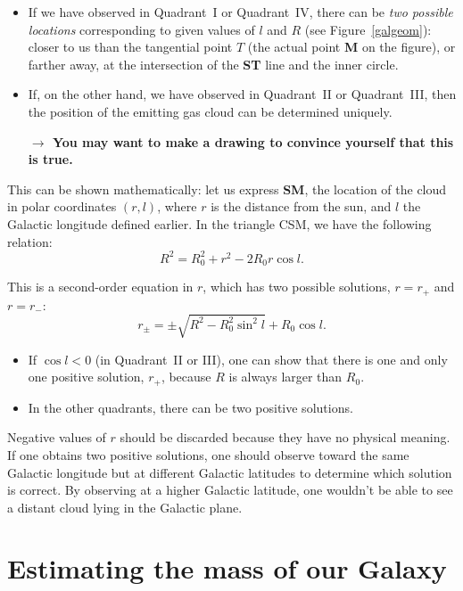 \begin{itemize}
\item{If we have observed in
Quadrant~I or Quadrant~IV, there can be {\em two possible locations} 
corresponding to given values of $l$ and $R$ (see
Figure~\ref{galgeom}): closer to us than the tangential point $T$
(the actual point {\bf M} on the figure), or farther away, at the
intersection of the {\bf ST} line and the inner circle.  }

\item{If, on the other
hand, we have observed in Quadrant~II or Quadrant~III, then the
position of the emitting gas cloud can be determined uniquely. 

{\bf{$\rightarrow$ You may want to make a drawing to convince yourself that
this is true.}} }
\end{itemize}

This can be shown mathematically: let us express {\bf SM}, 
the location of the cloud
in polar coordinates $(r,l)$, where $r$ is the distance from the sun,
and $l$ the Galactic longitude defined earlier.  In the triangle CSM,
we have the following relation:
\begin{equation}
R^2 = R_0^2 + r^2 - 2 R_0 r \cos l .
\end{equation}

This is a second-order equation in $r$, which has two possible solutions, 
$r=r_{+}$ and $r=r_{-}$:
\begin{equation}
\boxed{
r_\pm = \pm \sqrt{R^2 - R_0^2 \sin^2 l} + R_0\cos l .
}
\label{rpm}
\end{equation}

\begin{itemize}
\item{If $\cos l < 0$ (in Quadrant~II or III), one can show that
there is one and only one positive solution, $r_+$, because $R$ is
always larger than $R_0$.}

\item{In the other quadrants, there can be two
positive solutions.}
\end{itemize}

Negative values of $r$ should be discarded because  
they have no physical meaning.  If one obtains two positive
solutions, one should observe toward the same Galactic longitude but
at different Galactic latitudes to determine which solution is
correct.  By observing at a higher Galactic latitude, one wouldn't be able 
to see a distant cloud lying in the Galactic plane.


\section{Estimating the mass of our Galaxy}

